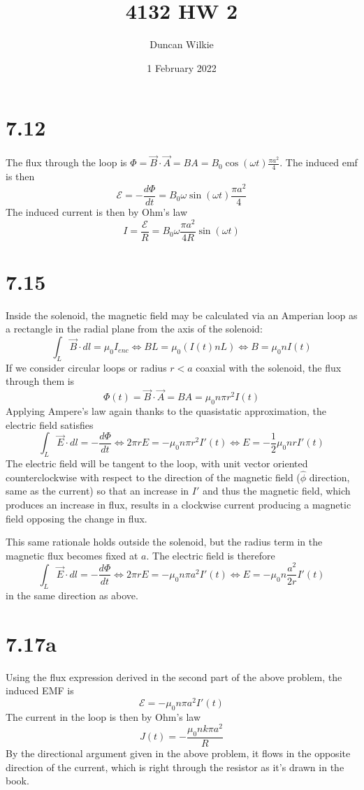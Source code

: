 \documentclass{article}
\title{4132 HW 2}
\author{Duncan Wilkie}
\date{1 February 2022}
\begin{document}
\maketitle

\section*{7.12}
The flux through the loop is $\Phi=\vec{B}\cdot{\vec{A}}=BA=B_0\cos(\omega t)\frac{\pi a^2}{4}$. The induced emf is then
\[\mathcal{E}=-\frac{d\Phi}{dt}=B_0\omega\sin(\omega t)\frac{\pi a^2}{4}\]
The induced current is then by Ohm's law
\[I=\frac{\mathcal{E}}{R}=B_0\omega\frac{\pi a^2}{4R}\sin(\omega t)\]

\section*{7.15}
Inside the solenoid, the magnetic field may be calculated via an Amperian loop as a rectangle in the radial plane from the axis of the solenoid:
\[\int_L\vec{B}\cdot dl=\mu_0I_{enc}\Leftrightarrow BL=\mu_0(I(t)nL) \Leftrightarrow B=\mu_0nI(t)\]
If we consider circular loops or radius $r<a$ coaxial with the solenoid, the flux through them is
\[\Phi(t)=\vec{B}\cdot\vec{A}=BA=\mu_0n\pi r^2I(t)\]
Applying Ampere's law again thanks to the quasistatic approximation, the electric field satisfies
\[\int_L\vec{E}\cdot dl=-\frac{d\Phi}{dt}\Leftrightarrow 2\pi rE=-\mu_0n\pi r^2I'(t)\Leftrightarrow E=-\frac{1}{2}\mu_0nrI'(t)\]
The electric field will be tangent to the loop, with unit vector oriented counterclockwise with respect to the direction of the magnetic field ($\hat{\phi}$ direction, same as the current) so that an increase in $I'$ and thus the magnetic field, which produces an increase in flux, results in a clockwise current producing a magnetic field opposing the change in flux.

This same rationale holds outside the solenoid, but the radius term in the magnetic flux becomes fixed at $a$. The electric field is therefore
\[\int_L\vec{E}\cdot dl=-\frac{d\Phi}{dt}\Leftrightarrow 2\pi rE=-\mu_0n\pi a^2I'(t)\Leftrightarrow E=-\mu_0n\frac{a^2}{2r}I'(t)\]
in the same direction as above.

\section*{7.17a}
Using the flux expression derived in the second part of the above problem, the induced EMF is
\[\mathcal{E}=-\mu_0n{\pi a^2}{}I'(t)\]
The current in the loop is then by Ohm's law
\[J(t)=-\frac{\mu_0nk\pi a^2}{R}\]
By the directional argument given in the above problem, it flows in the opposite direction of the current, which is right through the resistor as it's drawn in the book.
\end{document}
